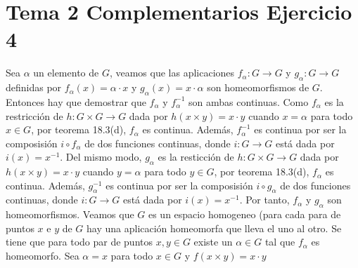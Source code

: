 \documentclass{article}
\begin{document}
\section{Tema 2 Complementarios Ejercicio 4}
Sea $\alpha$ un elemento de $G$, veamos que las aplicaciones $f_\alpha: G\rightarrow G$ y $g_\alpha: G\rightarrow G$ definidas por $f_\alpha(x)=\alpha \cdot x$ y $g_\alpha (x)=x\cdot \alpha$ son homeomorfismos de $G$. Entonces hay que demostrar que $f_\alpha$ y $f^{-1}_\alpha$ son ambas continuas. Como $f_\alpha$ es la restricción de $h:G\times G\rightarrow G$ dada por $h(x\times y)= x\cdot y $ cuando $x=\alpha$ para todo $x\in G$, por teorema 18.3(d), $f_\alpha$ es continua. Además, $f^{-1}_\alpha$ es continua por ser la composisión $i\circ f_\alpha$ de dos funciones continuas, donde $i:G\rightarrow G$ está dada por $i(x)=x^{-1}$. Del mismo modo, $g_\alpha$ es la resticción de $h:G\times G\rightarrow G$ dada por $h(x\times y)= x\cdot y $ cuando $y=\alpha$ para todo $y\in G$, por teorema 18.3(d), $f_\alpha$ es continua. Además, $g^{-1}_\alpha$ es continua por ser la composisión $i\circ g_\alpha$ de dos funciones continuas, donde $i:G\rightarrow G$ está dada por $i(x)=x^{-1}$. Por tanto, $f_\alpha$ y $g_\alpha$ son homeomorfismos. Veamos que $G$ es un espacio homogeneo (para cada para de puntos $x$ e $y$ de $G$ hay una aplicación homeomorfa que lleva el uno al otro. Se tiene que para todo par de puntos $x,y\in G$ existe un $\alpha \in G$ tal que $f_\alpha$ es homeomorfo. Sea $\alpha= x$ para todo $x\in G$ y $f(x\times y)=x\cdot y$
\end{document}
